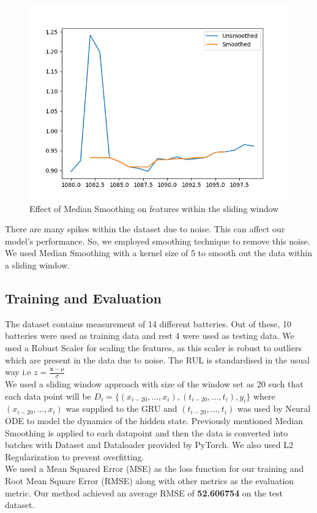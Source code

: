 \documentclass[12pt]{article}
\begin{document}
\begin{figure}[h]
\begin{minipage}{0.32\textwidth}
				\end{minipage}
				\hfill
				\begin{minipage}{0.32\textwidth}
					\centering
					\includegraphics[width=\textwidth]{imgs/smoothing_3.png}
				\end{minipage}
				\caption{Effect of Median Smoothing on features within the sliding window}
				\label{fig:three_plots}
			\end{figure}
			\footnotesize{There are many spikes within the dataset due to noise. This can affect our model's performance. So, we employed smoothing technique to remove this noise. We used Median Smoothing with a kernel size of 5 to smooth out the data within a sliding window.}
		\subsection{Training and Evaluation}
		The dataset contains measurement of 14 different batteries. Out of these, 10 batteries were used as training data and rest 4 were used as testing data. We used a Robust Scaler for scaling the features, as this scaler is robust to outliers which are present in the data due to noise. The RUL is standardised in the usual way i.e $z = \frac{\mathbf{x} - \mu}{\sigma}$
		\\
		We used a sliding window approach with size of the window set as 20 such that each data point will be $D_i = \{(x_{i-20}, \dots, x_i), (t_{i-20}, \dots, t_i), y_i\}$ where $(x_{i-20}, \dots, x_i)$ was supplied to the GRU and $(t_{i-20}, \dots, t_i)$ was used by Neural ODE to model the dynamics of the hidden state. Previously mentioned Median Smoothing is applied to each datapoint and then the data is converted into batches with Dataset and Dataloader provided by PyTorch. We also used L2 Regularization to prevent overfitting.
		\\
		\footnotesize{We used a Mean Squared Error (MSE) as the loss function for our training and Root Mean Square Error (RMSE) along with other metrics as the evaluation metric.}
		Our method achieved an average RMSE of \textbf{52.606754} on the test dataset.
		
\end{document}
